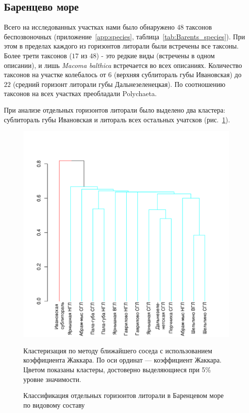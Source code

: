 \afterpage{\clearpage}

	\subsection{Баренцево море}

Всего на исследованных участках нами было обнаружено $48$ таксонов беспозвоночных (приложение~\ref{app:species}, таблица~\ref{tab:Barents_species}). 
При этом в пределах каждого из горизонтов литорали были встречены все таксоны. 
Более трети таксонов ($17$ из $48$) - это редкие виды (встречены в одном описании), и лишь {\it Macoma balthica} встречается во всех описаниях. 
Количество таксонов на участке колебалось от $6$ (верхняя сублитораль губы Ивановская) до $22$ (средний горизонт литорали губы Дальнезеленецкая). 
По соотношению таксонов на всех участках преобладали Polychaeta.
	

При анализе отдельных горизонтов литорали было выделено два кластера: сублитораль губы Ивановская и литораль всех остальных учатсков (рис.~\ref{ris:cluster_barents_species_tidal}). 
	\begin{figure}[p]
		\begin{center}
			\includegraphics{../Barenc_Sea/soobshestvo/Barents_fauna_tidal_jaccard_single_1.pdf}
		\end{center}
	\caption{Классификация отдельных горизонтов литорали в Баренцевом море по видовому составу}
	\label{ris:cluster_barents_species_tidal}

	\footnotesize{Кластеризация по методу ближайшего соседа с использованием коэффициента Жаккара. По оси ординат --- коэффициент Жаккара. Цветом показаны кластеры, достоверно выделяющиеся при 5\% уровне значимости.}
	\end{figure}

